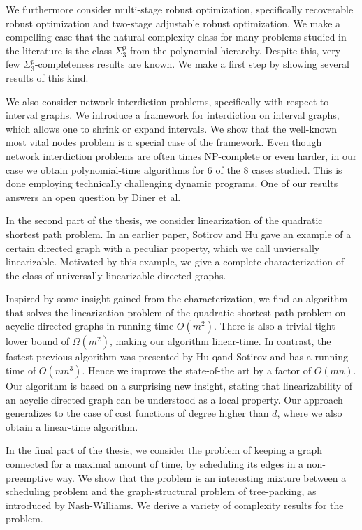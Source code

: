\documentclass[twoside,openright,bibliography=totoc]{scrreprt}
\begin{document}
We furthermore consider multi-stage robust optimization, specifically recoverable robust optimization and two-stage adjustable robust optimization. We make a compelling case that the natural complexity class for many problems studied in the literature is the class $\Sigma^p_3$ from the polynomial hierarchy. Despite this, very few $\Sigma^p_3$-completeness results are known. We make a first step by showing several results of this kind.

We also consider network interdiction problems, specifically with respect to interval graphs. We introduce a framework for interdiction on interval graphs, which allows one to shrink or expand intervals. We show that the well-known most vital nodes problem is a special case of the framework. Even though network interdiction problems are often times NP-complete or even harder, in our case we obtain polynomial-time algorithms for 6 of the 8 cases studied. This is done employing technically challenging dynamic programs. One of our results answers an open question by Diner et al. 

In the second part of the thesis, we consider linearization of the quadratic shortest path problem. In an earlier paper, Sotirov and Hu gave an example of a certain directed graph with a peculiar property, which we call unviersally linearizable. Motivated by this example, we give a complete characterization of the class of universally linearizable directed graphs. 

Inspired by some insight gained from the characterization,
we find an algorithm that solves the linearization problem of the quadratic shortest path problem on acyclic directed graphs in running time $O(m^2)$. 
There is also a trivial tight lower bound of $\Omega(m^2)$, making our algorithm linear-time. 
In contrast, the fastest previous algorithm was presented by Hu qand Sotirov and has a running time of $O(nm^3)$. Hence we improve the state-of-the art by a factor of $O(mn)$. Our algorithm is based on a surprising new insight, stating that linearizability of an acyclic directed graph can be understood as a local property.  Our approach generalizes to the case of cost functions of degree higher than $d$, where we also obtain a linear-time algorithm.

In the final part of the thesis, we consider the problem of keeping a graph connected for a maximal amount of time, by scheduling its edges in a non-preemptive way. 
We show that the problem is an interesting mixture between a scheduling problem and the graph-structural problem of tree-packing, as introduced by Nash-Williams. We derive a variety of complexity results for the problem.
\end{document}
